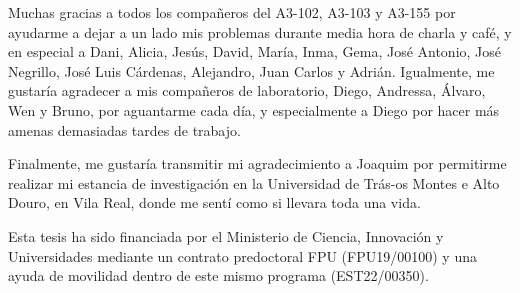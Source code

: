 \noindent Muchas gracias a todos los compañeros del A3-102, A3-103 y A3-155 por ayudarme a dejar a un lado mis problemas durante media hora de charla y café, y en especial a Dani, Alicia, Jesús, David, María, Inma, Gema, José Antonio, José Negrillo, José Luis Cárdenas, Alejandro, Juan Carlos y Adrián. Igualmente, me gustaría agradecer a mis compañeros de laboratorio, Diego, Andressa, Álvaro, Wen y Bruno, por aguantarme cada día, y especialmente a Diego por hacer más amenas demasiadas tardes de trabajo. 

\noindent Finalmente, me gustaría transmitir mi agradecimiento a Joaquim por permitirme realizar mi estancia de investigación en la Universidad de Trás-os Montes e Alto Douro, en Vila Real, donde me sentí como si llevara toda una vida. 

\vspace{50mm} 

\noindent Esta tesis ha sido financiada por el Ministerio de Ciencia, Innovación y Universidades mediante un contrato predoctoral FPU (FPU19/00100) y una ayuda de movilidad dentro de este mismo programa (EST22/00350).  

